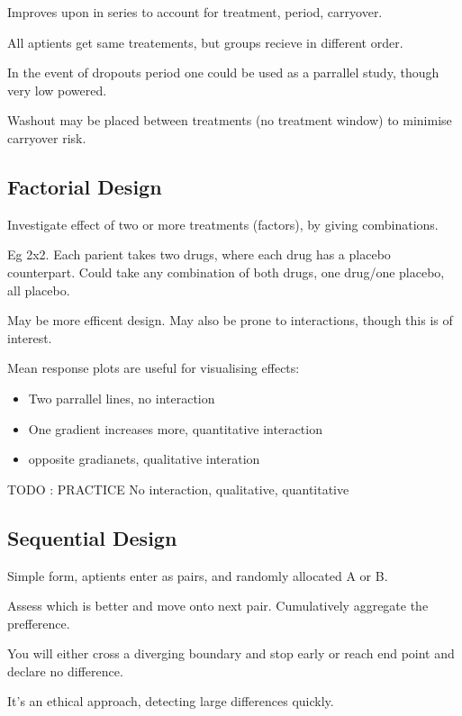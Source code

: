 \documentclass[
  letterpaper,
  DIV=11,
  numbers=noendperiod]{scrreprt}
\providecommand{\tightlist}{%
  \setlength{\itemsep}{0pt}\setlength{\parskip}{0pt}}\usepackage{longtable,booktabs,array}
\begin{document}
Improves upon in series to account for treatment, period, carryover.

All aptients get same treatements, but groups recieve in different
order.

In the event of dropouts period one could be used as a parrallel study,
though very low powered.

Washout may be placed between treatments (no treatment window) to
minimise carryover risk.

\hypertarget{factorial-design}{%
\subsection{Factorial Design}\label{factorial-design}}

Investigate effect of two or more treatments (factors), by giving
combinations.

Eg 2x2. Each parient takes two drugs, where each drug has a placebo
counterpart. Could take any combination of both drugs, one drug/one
placebo, all placebo.

May be more efficent design. May also be prone to interactions, though
this is of interest.

Mean response plots are useful for visualising effects:

\begin{itemize}
\tightlist
\item
  Two parrallel lines, no interaction
\item
  One gradient increases more, quantitative interaction
\item
  opposite gradianets, qualitative interation
\end{itemize}

TODO : PRACTICE No interaction, qualitative, quantitative

\hypertarget{sequential-design}{%
\subsection{Sequential Design}\label{sequential-design}}

Simple form, aptients enter as pairs, and randomly allocated A or B.

Assess which is better and move onto next pair. Cumulatively aggregate
the prefference.

You will either cross a diverging boundary and stop early or reach end
point and declare no difference.

It's an ethical approach, detecting large differences quickly.
\end{document}
